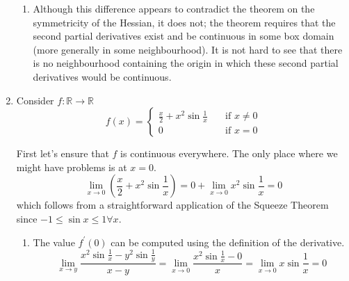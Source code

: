 \documentclass[letterpaper,11pt]{article}
\newcommand{\R}{\mathbb{R}}
\begin{document}
\begin{enumerate}
\begin{enumerate}
            \item
                Although this difference appears to contradict the theorem on
                the symmetricity of the Hessian, it does not; the theorem
                requires that the second partial derivatives exist and be
                continuous in some box domain (more generally in some
                neighbourhood). It is not hard to see that there is no
                neighbourhood containing the origin in which these second
                partial derivatives would be continuous.
        \end{enumerate}

    \item
        Consider $f : \R \to \R$
        \begin{equation*}
            f(x) = \begin{cases}
                \frac{x}{2} + x^2 \sin{\frac{1}{x}}
                    &\quad\text{if } x \neq 0 \\
                0   &\quad\text{if } x = 0
            \end{cases}
        \end{equation*}

        First let's ensure that $f$ is continuous everywhere. The only place
        where we might have problems is at $x = 0$.
        \begin{equation*}
            \lim_{x \to 0}\left(\frac{x}{2} + x^2 \sin{\frac{1}{x}}\right)
            = 0 + \lim_{x \to 0} {x^2 \sin{\frac{1}{x}}}
            = 0
        \end{equation*}
        which follows from a straightforward application of the Squeeze Theorem
        since $-1 \leq \sin{x} \leq 1 \forall x$.

        \begin{enumerate}
            \item
                The value $f^\prime(0)$ can be computed using the definition of
                the derivative.
                \begin{equation*}
                    \lim_{x \to y} {
                        \frac{x^2 \sin{\frac{1}{x}} - y^2 \sin{\frac{1}{y}}}{
                            x - y
                        }
                    }
                    = \lim_{x \to 0} {
                        \frac{x^2 \sin{\frac{1}{x}} - 0}{x}
                    }
                    = \lim_{x \to 0} {x \sin{\frac{1}{x}}}
                    = 0
                \end{equation*}


\end{enumerate}
\end{enumerate}
\end{document}
